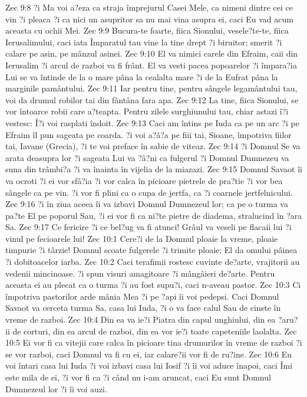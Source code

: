 Zec 9:8  ?i Ma voi a?eza ca straja împrejurul Casei Mele, ca nimeni dintre cei ce vin ?i pleaca ?i ca nici un asupritor sa nu mai vina asupra ei, caci Eu vad acum aceasta cu ochii Mei.
Zec 9:9  Bucura-te foarte, fiica Sionului, vesele?te-te, fiica Ierusalimului, caci iata Împaratul tau vine la tine drept ?i biruitor; smerit ?i calare pe asin, pe mânzul asinei.
Zec 9:10  El va nimici carele din Efraim, caii din Ierusalim ?i arcul de razboi va fi frânt. El va vesti pacea popoarelor ?i împara?ia Lui se va întinde de la o mare pâna la cealalta mare ?i de la Eufrat pâna la marginile pamântului.
Zec 9:11  Iar pentru tine, pentru sângele legamântului tau, voi da drumul robilor tai din fântâna fara apa.
Zec 9:12  La tine, fiica Sionului, se vor întoarce robii care a?teapta. Pentru zilele surghiunului tau, chiar astazi î?i vestesc: Î?i voi rasplati îndoit.
Zec 9:13  Caci am întins pe Iuda ca pe un arc ?i pe Efraim îl pun sageata pe coarda. ?i voi a?â?a pe fiii tai, Sioane, împotriva fiilor tai, Iavane (Grecia), ?i te voi preface în sabie de viteaz.
Zec 9:14  ?i Domnul Se va arata deasupra lor ?i sageata Lui va ?â?ni ca fulgerul ?i Domnul Dumnezeu va suna din trâmbi?a ?i va înainta în vijelia de la miazazi.
Zec 9:15  Domnul Savaot îi va ocroti ?i ei vor sfâ?ia ?i vor calca în picioare pietrele de pra?tie ?i vor bea sângele ca pe vin. ?i vor fi plini ca o cupa de jertfa, ca ?i coarnele jertfelnicului.
Zec 9:16  ?i în ziua aceea îi va izbavi Domnul Dumnezeul lor; ca pe o turma va pa?te El pe poporul Sau, ?i ei vor fi ca ni?te pietre de diadema, stralucind în ?ara Sa.
Zec 9:17  Ce fericire ?i ce bel?ug va fi atunci! Grâul va veseli pe flacaii lui ?i vinul pe fecioarele lui!
Zec 10:1  Cere?i de la Domnul ploaie la vreme, ploaie timpurie ?i târzie! Domnul scoate fulgerele ?i trimite ploaie; El da omului pâinea ?i dobitoacelor iarba.
Zec 10:2  Caci terafimii rostesc cuvinte de?arte, vrajitorii au vedenii mincinoase. ?i spun visuri amagitoare ?i mângâieri de?arte. Pentru aceasta ei au plecat ca o turma ?i au fost supu?i, caci n-aveau pastor.
Zec 10:3  Ci împotriva pastorilor arde mânia Mea ?i pe ?api îi voi pedepsi. Caci Domnul Savaot va cerceta turma Sa, casa lui Iuda, ?i o va face calul Sau de cinste în vreme de razboi.
Zec 10:4  Din ea va ie?i Piatra din capul unghiului, din ea ?aru?ii de corturi, din ea arcul de razboi, din ea vor ie?i toate capeteniile laolalta.
Zec 10:5  Ei vor fi ca vitejii care calca în picioare tina drumurilor în vreme de razboi ?i se vor razboi, caci Domnul va fi cu ei, iar calare?ii vor fi de ru?ine.
Zec 10:6  Eu voi întari casa lui Iuda ?i voi izbavi casa lui Iosif ?i îi voi aduce înapoi, caci Îmi este mila de ei, ?i vor fi ca ?i când nu i-am aruncat, caci Eu sunt Domnul Dumnezeul lor ?i îi voi auzi.
